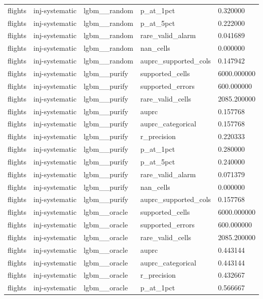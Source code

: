 \begin{tabular}{lllll}
flights & inj-systematic & lgbm\_\_random & p\_at\_1pct & 0.320000 \\
flights & inj-systematic & lgbm\_\_random & p\_at\_5pct & 0.222000 \\
flights & inj-systematic & lgbm\_\_random & rare\_valid\_alarm & 0.041689 \\
flights & inj-systematic & lgbm\_\_random & nan\_cells & 0.000000 \\
flights & inj-systematic & lgbm\_\_random & auprc\_supported\_cols & 0.147942 \\
flights & inj-systematic & lgbm\_\_purify & supported\_cells & 6000.000000 \\
flights & inj-systematic & lgbm\_\_purify & supported\_errors & 600.000000 \\
flights & inj-systematic & lgbm\_\_purify & rare\_valid\_cells & 2085.200000 \\
flights & inj-systematic & lgbm\_\_purify & auprc & 0.157768 \\
flights & inj-systematic & lgbm\_\_purify & auprc\_categorical & 0.157768 \\
flights & inj-systematic & lgbm\_\_purify & r\_precision & 0.220333 \\
flights & inj-systematic & lgbm\_\_purify & p\_at\_1pct & 0.280000 \\
flights & inj-systematic & lgbm\_\_purify & p\_at\_5pct & 0.240000 \\
flights & inj-systematic & lgbm\_\_purify & rare\_valid\_alarm & 0.071379 \\
flights & inj-systematic & lgbm\_\_purify & nan\_cells & 0.000000 \\
flights & inj-systematic & lgbm\_\_purify & auprc\_supported\_cols & 0.157768 \\
flights & inj-systematic & lgbm\_\_oracle & supported\_cells & 6000.000000 \\
flights & inj-systematic & lgbm\_\_oracle & supported\_errors & 600.000000 \\
flights & inj-systematic & lgbm\_\_oracle & rare\_valid\_cells & 2085.200000 \\
flights & inj-systematic & lgbm\_\_oracle & auprc & 0.443144 \\
flights & inj-systematic & lgbm\_\_oracle & auprc\_categorical & 0.443144 \\
flights & inj-systematic & lgbm\_\_oracle & r\_precision & 0.432667 \\
flights & inj-systematic & lgbm\_\_oracle & p\_at\_1pct & 0.566667 \\

\end{tabular}
